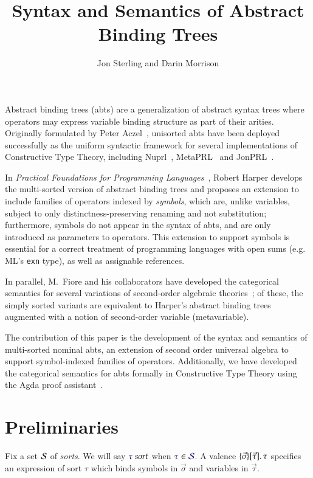 \documentclass[11pt]{article}
\theoremstyle{definition}
\theoremstyle{remark}
\numberwithin{equation}{section}
\begin{document}
\title{Syntax and Semantics of Abstract Binding Trees}
\date{}
\author{Jon Sterling and Darin Morrison}
\maketitle

Abstract binding trees (abts) are a generalization of abstract syntax trees
where operators may express variable binding structure as part of their arities.
Originally formulated by Peter Aczel~\cite{aczel:1978}, unisorted abts have been
deployed successfully as the uniform syntactic framework for several
implementations of Constructive Type Theory, including
Nuprl~\cite{constable:1986}, MetaPRL~\cite{hickey:2003} and
JonPRL~\cite{jonprl:2015}.

In \emph{Practical Foundations for Programming Languages}~\cite{harper:2016},
Robert Harper develops the multi-sorted version of abstract binding trees and
proposes an extension to include families of operators indexed by
\emph{symbols}, which are, unlike variables, subject to only
distinctness-preserving renaming and not substitution; furthermore, symbols do
not appear in the syntax of abts, and are only introduced as parameters to
operators. This extension to support symbols is essential for a correct
treatment of programming languages with open sums (e.g. ML's \texttt{exn} type),
as well as assignable references.

In parallel, M.\ Fiore and his collaborators have developed the categorical
semantics for several variations of second-order algebraic
theories~\cite{fiore:1999, fiore:2005, fiore-hur:2010, fiore-mamoud:2010}; of
these, the simply sorted variants are equivalent to Harper's abstract binding
trees augmented with a notion of second-order variable (metavariable).

The contribution of this paper is the development of the syntax and semantics
of multi-sorted nominal abts, an extension of second order universal algebra to
support symbol-indexed families of operators. Additionally, we have developed
the categorical semantics for abts formally in Constructive Type Theory using
the Agda proof assistant~\cite{norell:2007}.

\section{Preliminaries}

Fix a set $\mathcal{S}$ of \emph{sorts}. We will say $\IsSort{\tau}$ when
$\Member{\tau}{\Sorts}$. A valence $\MkValence{\vec{\sigma}}{\vec{\tau}}{\tau}$
specifies an expression of sort $\tau$ which binds symbols in $\vec{\sigma}$ and
variables in $\vec{\tau}$.
\end{document}
